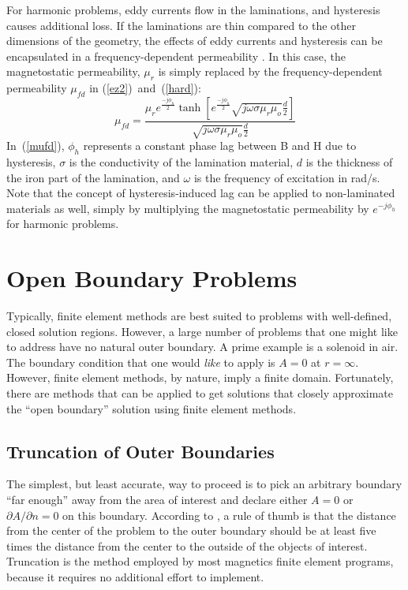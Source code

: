 \documentclass[12pt]{report}
\newcommand{\be}{\begin{equation}}
\newcommand{\ee}{\end{equation}}
\begin{document}
For harmonic problems, eddy currents flow in the laminations, and
hysteresis causes additional loss.  If the laminations are thin
compared to the other dimensions of the geometry, the effects of
eddy currents and hysteresis can be encapsulated in a
frequency-dependent permeability \cite{stoll}.  In this case, the
magnetostatic permeability, $\mu_r$ is simply replaced by the
frequency-dependent permeability $\mu_{fd}$ in
(\ref{ez2})~and~(\ref{hard}):
\be \label{mufd}
\mu_{fd} = \frac{\mu_r e^{\frac{-j \phi_h}{2}} \tanh \left[ e^{\frac{-j \phi_h}{2}}
\sqrt{j \omega \sigma \mu_r \mu_o} \frac{d}{2} \right]}
{\sqrt{j \omega \sigma \mu_r \mu_o} \frac{d}{2}} \ee
 In~(\ref{mufd}), $\phi_h$ represents a constant phase lag between
B and H due to hysteresis, $\sigma$ is the conductivity of the
lamination material, $d$ is the thickness of the iron part of the
lamination, and $\omega$ is the frequency of excitation in rad/s.
Note that the concept of hysteresis-induced lag can be applied to
non-laminated materials as well, simply by multiplying the
magnetostatic permeability by $e^{-j \phi_h}$ for harmonic
problems.

\section{Open Boundary Problems} \label{open_boundary}

Typically, finite element methods are best suited to problems with
well-defined, closed solution regions.  However, a large number of
problems that one might like to address have no natural outer
boundary.  A prime example is a solenoid in air.  The boundary
condition that one would {\em like} to apply is $A=0$ at
$r=\infty$.  However, finite element methods, by nature, imply a
finite domain.  Fortunately, there are methods that can be applied
to get solutions that closely approximate the ``open boundary''
solution using finite element methods.

\subsection{Truncation of Outer Boundaries}
The simplest, but least accurate, way to proceed is to pick an
arbitrary boundary ``far enough'' away from the area of interest
and declare either $A=0$ or $\partial A/\partial n=0$ on this
boundary.  According to \cite{chen}, a rule of thumb is that the
distance from the center of the problem to the outer boundary
should be at least five times the distance from the center to the
outside of the objects of interest.  Truncation is the method
employed by most magnetics finite element programs, because it
requires no additional effort to implement.
\end{document}
